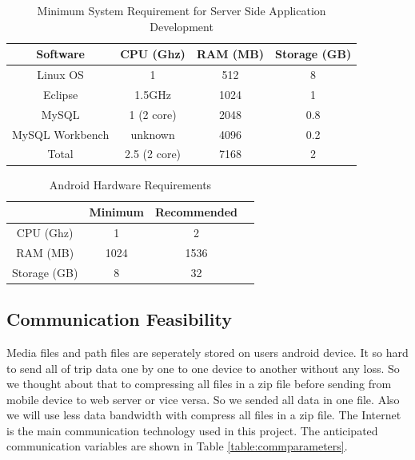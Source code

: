 \begin{table}[!ht]
\centering
\caption{Minimum System Requirement for Server Side Application Development}
\label{minreqserver}
\begin{tabular}{|c|c|c|c|}
\hline
\textbf{Software}& \textbf{CPU (Ghz)} & \textbf{RAM (MB)}  & \textbf{Storage (GB)} \\ \hline
Linux OS \cite{linuxMinimumSystemRequirements} & 1 & 512 & 8 \\ \hline
Eclipse \cite{eclipse} & 1.5GHz & 1024  & 1  \\ \hline
MySQL \cite{mysql} & 1 (2 core) & 2048 & 0.8 \\ \hline
MySQL Workbench\cite{mysql} & unknown & 4096 & 0.2 \\ \hline
Total\cite{mysql} & 2.5 (2 core) & 7168 & 2 \\ \hline
\end{tabular}
\end{table}

\begin{table}[!ht]
\centering
\caption{Android Hardware Requirements}
\label{androidhardware}
\begin{tabular}{|c|c|c|c|}
\hline
            & \textbf{Minimum}    & \textbf{Recommended} \\\hline
CPU (Ghz) & 1      & 2     \\\hline
RAM (MB)      & 1024       & 1536        \\\hline
Storage (GB)   & 8     & 32       \\\hline
\end{tabular}
\end{table}

\newpage
\subsection{Communication Feasibility}

Media files and path files are seperately stored on users android device. It so hard to send all of trip data one by one to one device to another without any loss. So we thought about that to compressing all files in a zip file before sending from mobile device to web server or vice versa. So we sended all data in one file. Also we will use less data bandwidth with compress all files in a zip file.
The Internet is the main communication technology used in this project. The
anticipated communication variables are shown in Table \ref{table:commparameters}.

